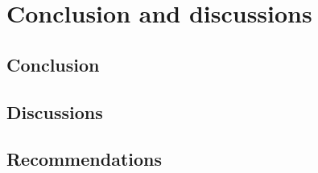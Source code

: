\chapter{Conclusion and discussions}
\label{ch:conclusionanddiscussions}

\lipsum[1]




\section{Conclusion}
\label{sec:conclusion}

\lipsum[1]

\section{Discussions}
\label{sec:discussions}

\lipsum[1]

\section{Recommendations}
\label{sec:reccomandations}

\lipsum[1]
